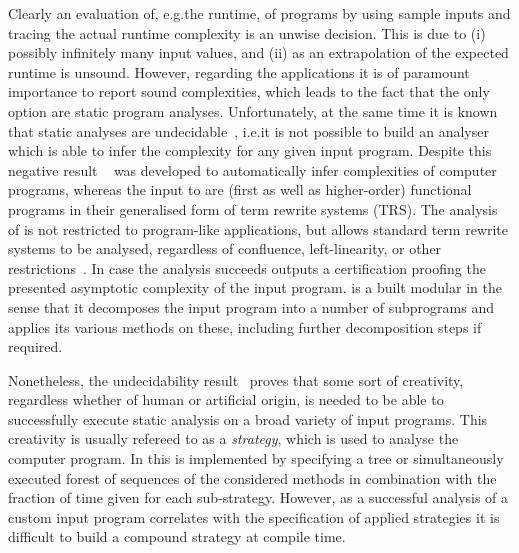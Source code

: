 \documentclass[envcountsame]{llncs}
\begin{document}
Clearly an evaluation of, e.g.\@ the runtime, of programs by using sample inputs and tracing the
actual runtime complexity is an unwise decision. This is due to (i) possibly infinitely many input
values, and (ii) as an extrapolation of the expected runtime is unsound. However, regarding the
applications it is of paramount importance to report sound complexities, which leads to the fact
that the only option are static program analyses. Unfortunately, at the same time it is known that
static analyses are undecidable~\cite{landi1992undecidability}, i.e.\@ it is not possible to build
an analyser which is able to infer the complexity for any given input program.
%
Despite this negative result \tct{}~\cite{avanzini2016tct} was developed to automatically infer
complexities of computer programs, whereas the input to \tct{} are (first as well as higher-order)
functional programs in their generalised form of term rewrite systems (TRS). The analysis of \tct{}
is not restricted to program-like applications, but allows standard term rewrite systems to be
analysed, regardless of confluence, left-linearity, or other restrictions~\cite{avanzini2016tct}. In
case the analysis succeeds \tct{} outputs a certification proofing the presented asymptotic
complexity of the input program. \tct{} is a built modular in the sense that it decomposes the input
program into a number of subprograms and applies its various methods on these, including further
decomposition steps if required. 

Nonetheless, the undecidability result~\cite{landi1992undecidability} proves that some sort of
creativity, regardless whether of human or artificial origin, is needed to be able to successfully
execute static analysis on a broad variety of input programs. This creativity is usually refereed to
as a \textit{strategy}, which is used to analyse the computer program. In \tct{} this is implemented
by specifying a tree or simultaneously executed forest of sequences of the considered methods in
combination with the fraction of time given for each sub-strategy. However, as a successful analysis
of a custom input program correlates with the specification of applied strategies it is difficult to
build a compound strategy at compile time.
\end{document}

